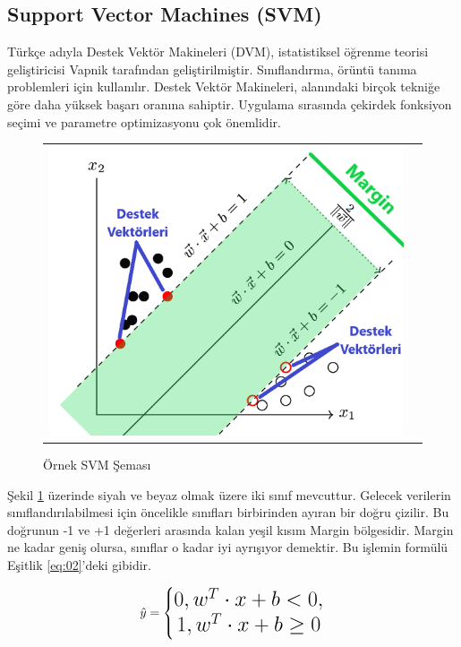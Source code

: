 \documentclass[conference]{IEEEtran}
\begin{document}
\subsection{\textbf{Support Vector Machines (SVM)}}
\quad Türkçe adıyla Destek Vektör Makineleri (DVM), istatistiksel öğrenme teorisi geliştiricisi Vapnik tarafından geliştirilmiştir. Sınıflandırma, örüntü tanıma problemleri için kullanılır. Destek Vektör Makineleri, alanındaki birçok tekniğe göre daha yüksek başarı oranına sahiptir. Uygulama sırasında çekirdek fonksiyon seçimi ve parametre optimizasyonu çok önemlidir\cite{11}.

\begin{figure}[!h]
	\centering%
	\begin{center}
		\begin{tabular}{cc}%
			\includegraphics[scale=0.3]{pictures/pic_03.png}&%
		\end{tabular}%
	\end{center}
	\caption{Örnek SVM Şeması\cite{12}}%
	\label{fig:03}
\end{figure}

Şekil \ref{fig:03} üzerinde siyah ve beyaz olmak üzere iki sınıf mevcuttur. Gelecek verilerin sınıflandırılabilmesi için öncelikle sınıfları birbirinden ayıran bir doğru çizilir. Bu doğrunun -1 ve +1 değerleri arasında kalan yeşil kısım Margin bölgesidir. Margin ne kadar geniş olursa, sınıflar o kadar iyi ayrışıyor demektir. Bu işlemin formülü Eşitlik \ref{eq:02}'deki gibidir.

\begin{equation}
\label{eq:02}
\Large \hat{y}=\left\{\begin{matrix} 0, w^{T} \cdot x + b < 0,\\ 1, w^{T} \cdot x + b \geq 0 \end{matrix}\right.
\end{equation}
\end{document}
